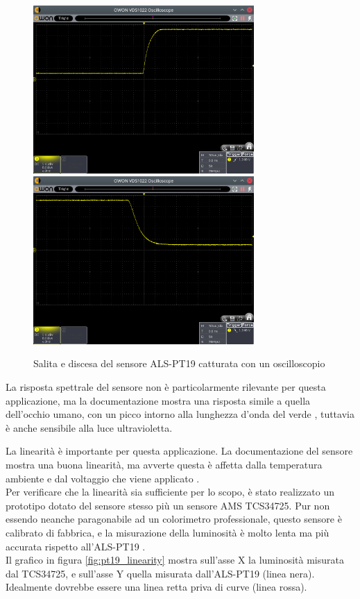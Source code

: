 \begin{figure}[h!]
	\centering
	\includegraphics[width=0.75\textwidth]{Dispositivo_files/sensor_scope_rise.png}
	\includegraphics[width=0.75\textwidth]{Dispositivo_files/sensor_scope_fall.png}
	\caption{Salita e discesa del sensore ALS-PT19 catturata con un oscilloscopio}
	\label{fig:sensor_scope_risefall}
\end{figure}

La risposta spettrale del sensore non è particolarmente rilevante per questa applicazione, ma la documentazione mostra una risposta simile a quella dell'occhio umano, con un picco intorno alla lunghezza d'onda del verde \cite{als_pt19_datasheet}, tuttavia è anche sensibile alla luce ultravioletta.

La linearità è importante per questa applicazione. La documentazione del sensore mostra una buona linearità, ma avverte questa è affetta dalla temperatura ambiente e dal voltaggio che viene applicato \cite{als_pt19_datasheet}.\\
Per verificare che la linearità sia sufficiente per lo scopo, è stato realizzato un prototipo dotato del sensore stesso più un sensore AMS TCS34725. Pur non essendo neanche paragonabile ad un colorimetro professionale, questo sensore è calibrato di fabbrica, e la misurazione della luminosità è molto lenta ma più accurata rispetto all'ALS-PT19 \cite{tcs34725_datasheet}.\\
Il grafico in figura \ref{fig:pt19_linearity} mostra sull'asse X la luminosità misurata dal TCS34725, e sull'asse Y quella misurata dall'ALS-PT19 (linea nera). Idealmente dovrebbe essere una linea retta priva di curve (linea rossa).


